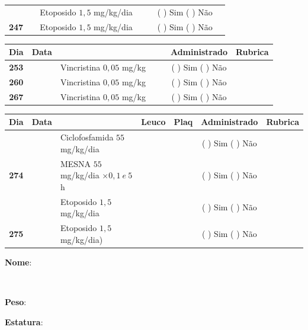 \documentclass[11pt,a4paper,oldfontcommands]{memoir}
\def\entrywithlabel[#1]#2{\parbox{#1}{{\small #2:} \hrulefill}}
\begin{document}
\begin{center}
\begin{table}[H]
\begin{tabular}{p{1cm}c|p{4.8cm}|p{1.8cm}p{1.8cm}|c|c}
    \cline{4-5}
    \multicolumn{1}{c|}{}&\multirow{1}{*}{}&{Etoposido \(1,5\) mg/kg/dia}&{}&&{(  ) Sim (  ) Não}&\\
    \cline{1-3}\cline{6-6}
    \multicolumn{1}{c|}{\textbf{247}}&\multirow{1}{*}{}&{Etoposido \(1,5\) mg/kg/dia}&{}&&{(  ) Sim (  ) Não}&\\
    \hline
\end{tabular}
\end{table}
\begin{table}[H] \small
\begin{tabular}{p{1cm}c|p{4.8cm}|p{1.8cm}p{1.8cm}|c|c}
	\hline
	\multicolumn{1}{c|}{\multirow{1}{*}{\textbf{Dia}}}&{Data}&{}&{}&&{Administrado}&{Rubrica} \\
    \hline
    \multicolumn{1}{c|}{\textbf{253}}&&{Vincristina \(0,05\) mg/kg}&\multicolumn{1}{c}{}&&{(  ) Sim (  ) Não}&\\
    \hline
    \multicolumn{1}{c|}{\textbf{260}}&&{Vincristina \(0,05\) mg/kg}&\multicolumn{1}{c}{}&&{(  ) Sim (  ) Não}&\\
    \hline
    \multicolumn{1}{c|}{\textbf{267}}&&{Vincristina \(0,05\) mg/kg}&\multicolumn{1}{c}{}&&{(  ) Sim (  ) Não}&\\
    \hline
\end{tabular}
\end{table}
\begin{table}[H] \small
\begin{tabular}{p{1cm}c|p{4.8cm}|p{1.8cm}p{1.8cm}|c|c}
	\hline
	\multicolumn{1}{c|}{\multirow{1}{*}{\textbf{Dia}}}&{Data}&{}&\multicolumn{1}{c|}{Leuco}&\multicolumn{1}{c|}{Plaq}&{Administrado}&{Rubrica} \\
    \hline
    \multicolumn{1}{c|}{\multirow{3}{*}{\textbf{274}}}&&{Ciclofosfamida \(55\) mg/kg/dia}&\multicolumn{1}{c|}{}&&{(  ) Sim (  ) Não}&\\
    \cline{4-5}
    \multicolumn{1}{c|}{}&&{MESNA \(55\) mg/kg/dia \(\times 0,1 \:e\: 5\)h}&&&{(  ) Sim (  ) Não}&\\
    \multicolumn{1}{c|}{}&&{Etoposido \(1,5\) mg/kg/dia}&&&{(  ) Sim (  ) Não}&\\
    \hline
    \multicolumn{1}{c|}{\multirow{1}{*}{\textbf{275}}}&&{Etoposido \(1,5\) mg/kg/dia)}&{}&&{(  ) Sim (  ) Não}&\\
    \hline
\end{tabular}
\end{table}
\pagebreak
    \noindent
\entrywithlabel[1\hsize]{\textbf{Nome}}\hfill
\\[0.3cm]
\entrywithlabel[.45\hsize]{\textbf{Peso}}\hfill  \entrywithlabel[.45\hsize]{\textbf{Estatura}}


\end{center}
\end{document}
